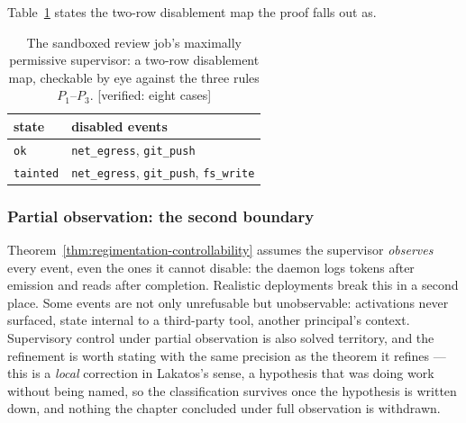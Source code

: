 \documentclass[11pt,a4paper]{article}
\theoremstyle{definition}
\theoremstyle{remark}
\begin{document}
Table~\ref{tab:swk-review-disablement} states the two-row disablement map the
proof falls out as.

\begin{table}[H]
\centering
\caption{The sandboxed review job's maximally permissive supervisor: a
two-row disablement map, checkable by eye against the three rules $P_1$--$P_3$.
[verified: eight cases]}
\label{tab:swk-review-disablement}
\small
\renewcommand{\arraystretch}{1.2}
\begin{tabularx}{\textwidth}{@{}>{\raggedright\arraybackslash}p{} X@{}}
\toprule
\textbf{state} & \textbf{disabled events} \\
\midrule
\texttt{ok} & \texttt{net\_egress}, \texttt{git\_push} \\
\texttt{tainted} & \texttt{net\_egress}, \texttt{git\_push}, \texttt{fs\_write} \\
\bottomrule
\end{tabularx}
\end{table}

\subsubsection{Partial observation: the second boundary}
\label{sec:partial-observation}

Theorem~\ref{thm:regimentation-controllability} assumes the supervisor \emph{observes} every
event, even the ones it cannot disable: the daemon logs tokens after emission and reads after
completion. Realistic deployments break this in a second place. Some events are not only
unrefusable but unobservable: activations never surfaced, state internal to a third-party
tool, another principal's context. Supervisory control under partial observation is also
solved territory, and the refinement is worth stating with the same precision as the theorem
it refines --- this is a \emph{local} correction in Lakatos's sense, a hypothesis that was
doing work without being named, so the classification survives once the hypothesis is written
down, and nothing the chapter concluded under full observation is withdrawn.
\end{document}
